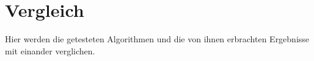 \section{Vergleich}
Hier werden die getesteten Algorithmen und die von ihnen erbrachten Ergebnisse mit einander verglichen.